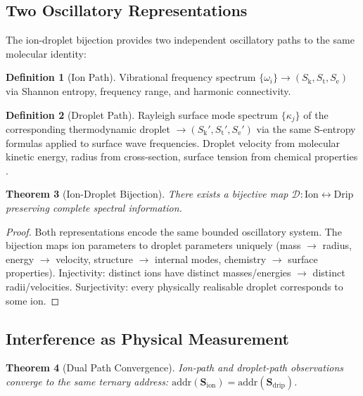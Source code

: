 \documentclass[11pt,twocolumn,a4paper]{article}
\newtheorem{theorem}{Theorem}[section]
\theoremstyle{definition}
\newtheorem{definition}[theorem]{Definition}
\theoremstyle{remark}
\newcommand{\Sk}{S_{\mathrm{k}}}
\newcommand{\St}{S_{\mathrm{t}}}
\newcommand{\Se}{S_{\mathrm{e}}}
\begin{document}
\subsection{Two Oscillatory Representations}

The ion-droplet bijection provides two independent oscillatory paths to the same molecular identity:

\begin{definition}[Ion Path]
Vibrational frequency spectrum $\{\omega_i\} \to (\Sk, \St, \Se)$ via Shannon entropy, frequency range, and harmonic connectivity.
\end{definition}

\begin{definition}[Droplet Path]
Rayleigh surface mode spectrum $\{\kappa_j\}$ of the corresponding thermodynamic droplet $\to (\Sk', \St', \Se')$ via the same S-entropy formulas applied to surface wave frequencies. Droplet velocity from molecular kinetic energy, radius from cross-section, surface tension from chemical properties \citep{rayleigh1879, lamb1881}.
\end{definition}

\begin{theorem}[Ion-Droplet Bijection]
\label{thm:bijection}
There exists a bijective map $\mathcal{D}: \mathrm{Ion} \leftrightarrow \mathrm{Drip}$ preserving complete spectral information.
\end{theorem}

\begin{proof}
Both representations encode the same bounded oscillatory system. The bijection maps ion parameters to droplet parameters uniquely (mass $\to$ radius, energy $\to$ velocity, structure $\to$ internal modes, chemistry $\to$ surface properties). Injectivity: distinct ions have distinct masses/energies $\to$ distinct radii/velocities. Surjectivity: every physically realisable droplet corresponds to some ion.
\end{proof}

\subsection{Interference as Physical Measurement}

\begin{theorem}[Dual Path Convergence]
\label{thm:convergence}
Ion-path and droplet-path observations converge to the same ternary address: $\mathrm{addr}(\mathbf{S}_{\mathrm{ion}}) = \mathrm{addr}(\mathbf{S}_{\mathrm{drip}})$.
\end{theorem}
\end{document}
